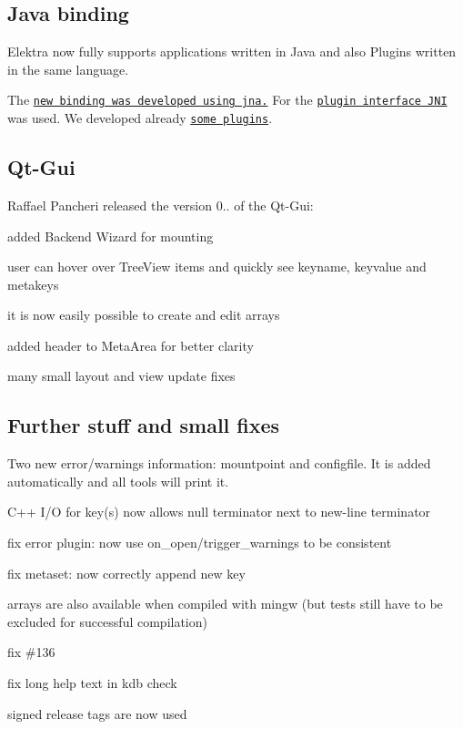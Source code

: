 \subsection*{Java binding}

Elektra now fully supports applications written in Java and also Plugins written in the same language.

The \href{https://github.com/ElektraInitiative/libelektra/tree/master/src/bindings/jna}{\tt new binding was developed using jna.} For the \href{https://github.com/ElektraInitiative/libelektra/tree/master/src/plugins/jni}{\tt plugin interface J\+N\+I} was used. We developed already \href{https://github.com/ElektraInitiative/libelektra/tree/master/src/bindings/jna/elektra/plugin}{\tt some plugins}.

\subsection*{Qt-\/\+Gui}

Raffael Pancheri released the version 0.. of the Qt-\/\+Gui\+:


\begin{DoxyItemize}
\item added Backend Wizard for mounting
\item user can hover over Tree\+View items and quickly see keyname, keyvalue and metakeys
\item it is now easily possible to create and edit arrays
\item added header to Meta\+Area for better clarity
\item many small layout and view update fixes
\end{DoxyItemize}

\subsection*{Further stuff and small fixes}


\begin{DoxyItemize}
\item Two new error/warnings information\+: mountpoint and configfile. It is added automatically and all tools will print it.
\item C++ I/\+O for key(s) now allows null terminator next to new-\/line terminator
\item fix error plugin\+: now use on\+\_\+open/trigger\+\_\+warnings to be consistent
\item fix metaset\+: now correctly append new key
\item arrays are also available when compiled with mingw (but tests still have to be excluded for successful compilation)
\item fix \#136
\item fix long help text in {\ttfamily kdb check}
\item signed release tags are now used
\end{DoxyItemize}

